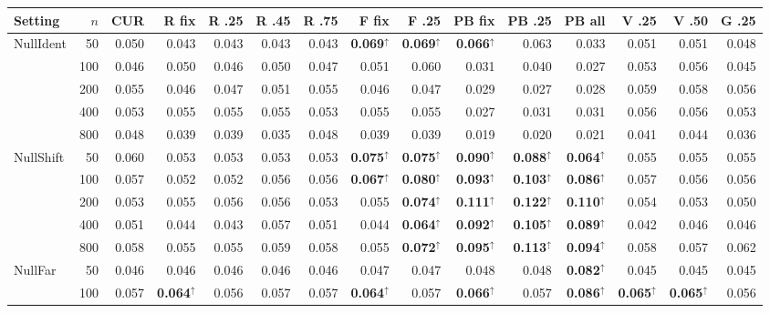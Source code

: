 \begin{tabular}{@{}lrrrrrrrrrrrrrr@{}}
\toprule
Setting & $n$ & CUR & R fix & R .25 & R .45 & R .75 & F fix & F .25 & PB fix & PB .25 & PB all & V .25 & V .50 & G .25\\
\midrule
NullIdent & 50 & 0.050 & 0.043 & 0.043 & 0.043 & 0.043 & \textbf{0.069}$^{\uparrow}$ & \textbf{0.069}$^{\uparrow}$ & \textbf{0.066}$^{\uparrow}$ & 0.063 & 0.033 & 0.051 & 0.051 & 0.048\\
 & 100 & 0.046 & 0.050 & 0.046 & 0.050 & 0.047 & 0.051 & 0.060 & 0.031 & 0.040 & 0.027 & 0.053 & 0.056 & 0.045\\
 & 200 & 0.055 & 0.046 & 0.047 & 0.051 & 0.055 & 0.046 & 0.047 & 0.029 & 0.027 & 0.028 & 0.059 & 0.058 & 0.056\\
 & 400 & 0.053 & 0.055 & 0.055 & 0.055 & 0.053 & 0.055 & 0.055 & 0.027 & 0.031 & 0.031 & 0.056 & 0.056 & 0.053\\
 & 800 & 0.048 & 0.039 & 0.039 & 0.035 & 0.048 & 0.039 & 0.039 & 0.019 & 0.020 & 0.021 & 0.041 & 0.044 & 0.036\\
\addlinespace[2pt]
NullShift & 50 & 0.060 & 0.053 & 0.053 & 0.053 & 0.053 & \textbf{0.075}$^{\uparrow}$ & \textbf{0.075}$^{\uparrow}$ & \textbf{0.090}$^{\uparrow}$ & \textbf{0.088}$^{\uparrow}$ & \textbf{0.064}$^{\uparrow}$ & 0.055 & 0.055 & 0.055\\
 & 100 & 0.057 & 0.052 & 0.052 & 0.056 & 0.056 & \textbf{0.067}$^{\uparrow}$ & \textbf{0.080}$^{\uparrow}$ & \textbf{0.093}$^{\uparrow}$ & \textbf{0.103}$^{\uparrow}$ & \textbf{0.086}$^{\uparrow}$ & 0.057 & 0.056 & 0.056\\
 & 200 & 0.053 & 0.055 & 0.056 & 0.056 & 0.053 & 0.055 & \textbf{0.074}$^{\uparrow}$ & \textbf{0.111}$^{\uparrow}$ & \textbf{0.122}$^{\uparrow}$ & \textbf{0.110}$^{\uparrow}$ & 0.054 & 0.053 & 0.050\\
 & 400 & 0.051 & 0.044 & 0.043 & 0.057 & 0.051 & 0.044 & \textbf{0.064}$^{\uparrow}$ & \textbf{0.092}$^{\uparrow}$ & \textbf{0.105}$^{\uparrow}$ & \textbf{0.089}$^{\uparrow}$ & 0.042 & 0.046 & 0.046\\
 & 800 & 0.058 & 0.055 & 0.055 & 0.059 & 0.058 & 0.055 & \textbf{0.072}$^{\uparrow}$ & \textbf{0.095}$^{\uparrow}$ & \textbf{0.113}$^{\uparrow}$ & \textbf{0.094}$^{\uparrow}$ & 0.058 & 0.057 & 0.062\\
\addlinespace[2pt]
NullFar & 50 & 0.046 & 0.046 & 0.046 & 0.046 & 0.046 & 0.047 & 0.047 & 0.048 & 0.048 & \textbf{0.082}$^{\uparrow}$ & 0.045 & 0.045 & 0.045\\
 & 100 & 0.057 & \textbf{0.064}$^{\uparrow}$ & 0.056 & 0.057 & 0.057 & \textbf{0.064}$^{\uparrow}$ & 0.057 & \textbf{0.066}$^{\uparrow}$ & 0.057 & \textbf{0.086}$^{\uparrow}$ & \textbf{0.065}$^{\uparrow}$ & \textbf{0.065}$^{\uparrow}$ & 0.056\\

\end{tabular}
